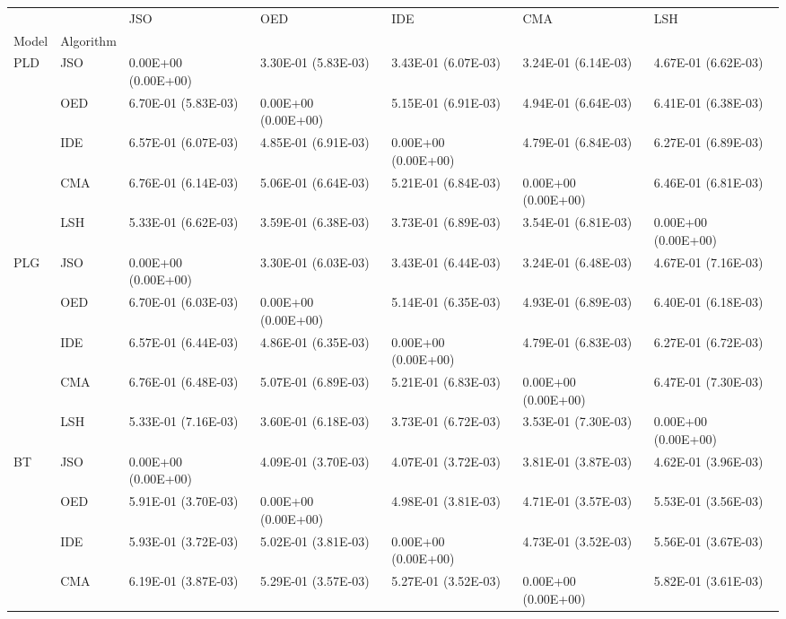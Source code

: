 \begin{tabular}{lllllll}
\toprule
   &     &                  JSO &                  OED &                  IDE &                  CMA &                  LSH \\
Model & Algorithm &                      &                      &                      &                      &                      \\
\midrule
PLD & JSO &  0.00E+00 (0.00E+00) &  3.30E-01 (5.83E-03) &  3.43E-01 (6.07E-03) &  3.24E-01 (6.14E-03) &  4.67E-01 (6.62E-03) \\
   & OED &  6.70E-01 (5.83E-03) &  0.00E+00 (0.00E+00) &  5.15E-01 (6.91E-03) &  4.94E-01 (6.64E-03) &  6.41E-01 (6.38E-03) \\
   & IDE &  6.57E-01 (6.07E-03) &  4.85E-01 (6.91E-03) &  0.00E+00 (0.00E+00) &  4.79E-01 (6.84E-03) &  6.27E-01 (6.89E-03) \\
   & CMA &  6.76E-01 (6.14E-03) &  5.06E-01 (6.64E-03) &  5.21E-01 (6.84E-03) &  0.00E+00 (0.00E+00) &  6.46E-01 (6.81E-03) \\
   & LSH &  5.33E-01 (6.62E-03) &  3.59E-01 (6.38E-03) &  3.73E-01 (6.89E-03) &  3.54E-01 (6.81E-03) &  0.00E+00 (0.00E+00) \\
PLG & JSO &  0.00E+00 (0.00E+00) &  3.30E-01 (6.03E-03) &  3.43E-01 (6.44E-03) &  3.24E-01 (6.48E-03) &  4.67E-01 (7.16E-03) \\
   & OED &  6.70E-01 (6.03E-03) &  0.00E+00 (0.00E+00) &  5.14E-01 (6.35E-03) &  4.93E-01 (6.89E-03) &  6.40E-01 (6.18E-03) \\
   & IDE &  6.57E-01 (6.44E-03) &  4.86E-01 (6.35E-03) &  0.00E+00 (0.00E+00) &  4.79E-01 (6.83E-03) &  6.27E-01 (6.72E-03) \\
   & CMA &  6.76E-01 (6.48E-03) &  5.07E-01 (6.89E-03) &  5.21E-01 (6.83E-03) &  0.00E+00 (0.00E+00) &  6.47E-01 (7.30E-03) \\
   & LSH &  5.33E-01 (7.16E-03) &  3.60E-01 (6.18E-03) &  3.73E-01 (6.72E-03) &  3.53E-01 (7.30E-03) &  0.00E+00 (0.00E+00) \\
BT & JSO &  0.00E+00 (0.00E+00) &  4.09E-01 (3.70E-03) &  4.07E-01 (3.72E-03) &  3.81E-01 (3.87E-03) &  4.62E-01 (3.96E-03) \\
   & OED &  5.91E-01 (3.70E-03) &  0.00E+00 (0.00E+00) &  4.98E-01 (3.81E-03) &  4.71E-01 (3.57E-03) &  5.53E-01 (3.56E-03) \\
   & IDE &  5.93E-01 (3.72E-03) &  5.02E-01 (3.81E-03) &  0.00E+00 (0.00E+00) &  4.73E-01 (3.52E-03) &  5.56E-01 (3.67E-03) \\
   & CMA &  6.19E-01 (3.87E-03) &  5.29E-01 (3.57E-03) &  5.27E-01 (3.52E-03) &  0.00E+00 (0.00E+00) &  5.82E-01 (3.61E-03) \\

\end{tabular}
